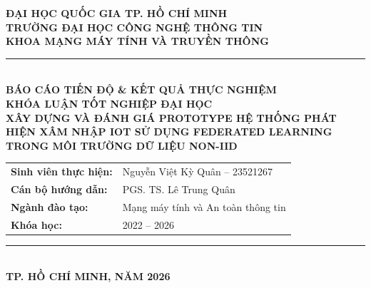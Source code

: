 \begin{titlepage}
    \centering
    \Large \textbf{ĐẠI HỌC QUỐC GIA TP. HỒ CHÍ MINH} \\
    \textbf{TRƯỜNG ĐẠI HỌC CÔNG NGHỆ THÔNG TIN} \\
    \textbf{KHOA MẠNG MÁY TÍNH VÀ TRUYỀN THÔNG} \\[1.5cm]

    \rule{0.85\textwidth}{1.2pt} \\[0.8cm]

    \LARGE \textbf{BÁO CÁO TIẾN ĐỘ \& KẾT QUẢ THỰC NGHIỆM}\\
    \textbf{KHÓA LUẬN TỐT NGHIỆP ĐẠI HỌC} \\[0.8cm]

    \huge \textbf{XÂY DỰNG VÀ ĐÁNH GIÁ PROTOTYPE HỆ THỐNG PHÁT HIỆN XÂM NHẬP IOT SỬ DỤNG FEDERATED LEARNING TRONG MÔI TRƯỜNG DỮ LIỆU NON-IID} \\[1.5cm]

    \Large
    \begin{tabular}{ll}
        \textbf{Sinh viên thực hiện:} & Nguyễn Việt Kỳ Quân -- 23521267 \\
        \textbf{Cán bộ hướng dẫn:}   & PGS. TS. Lê Trung Quân \\
        \textbf{Ngành đào tạo:}      & Mạng máy tính và An toàn thông tin \\
        \textbf{Khóa học:}           & 2022 -- 2026 \\
    \end{tabular}

    \vfill
    \rule{0.85\textwidth}{1.2pt} \\[0.4cm]
    \large \textbf{TP. HỒ CHÍ MINH, NĂM 2026}
\end{titlepage}
